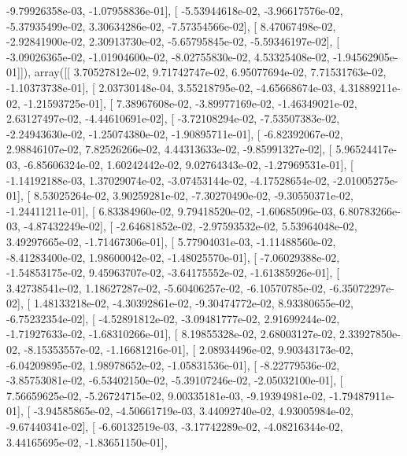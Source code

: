 \documentclass{article}
\begin{document}
         -9.79926358e-03,  -1.07958836e-01],
       [ -5.53944618e-02,  -3.96617576e-02,  -5.37935499e-02,
          3.30634286e-02,  -7.57354566e-02],
       [  8.47067498e-02,  -2.92841900e-02,   2.30913730e-02,
         -5.65795845e-02,  -5.59346197e-02],
       [ -3.09026365e-02,  -1.01904600e-02,  -8.02755830e-02,
          4.53325408e-02,  -1.94562905e-01]]), array([[  3.70527812e-02,   9.71742747e-02,   6.95077694e-02,
          7.71531763e-02,  -1.10373738e-01],
       [  2.03730148e-04,   3.55218795e-02,  -4.65668674e-03,
          4.31889211e-02,  -1.21593725e-01],
       [  7.38967608e-02,  -3.89977169e-02,  -1.46349021e-02,
          2.63127497e-02,  -4.44610691e-02],
       [ -3.72108294e-02,  -7.53507383e-02,  -2.24943630e-02,
         -1.25074380e-02,  -1.90895711e-01],
       [ -6.82392067e-02,   2.98846107e-02,   7.82526266e-02,
          4.44313633e-02,  -9.85991327e-02],
       [  5.96524417e-03,  -6.85606324e-02,   1.60242442e-02,
          9.02764343e-02,  -1.27969531e-01],
       [ -1.14192188e-03,   1.37029074e-02,  -3.07453144e-02,
         -4.17528654e-02,  -2.01005275e-01],
       [  8.53025264e-02,   3.90259281e-02,  -7.30270490e-02,
         -9.30550371e-02,  -1.24411211e-01],
       [  6.83384960e-02,   9.79418520e-02,  -1.60685096e-03,
          6.80783266e-03,  -4.87432249e-02],
       [ -2.64681852e-02,  -2.97593532e-02,   5.53964048e-02,
          3.49297665e-02,  -1.71467306e-01],
       [  5.77904031e-03,  -1.11488560e-02,  -8.41283400e-02,
          1.98600042e-02,  -1.48025570e-01],
       [ -7.06029388e-02,  -1.54853175e-02,   9.45963707e-02,
         -3.64175552e-02,  -1.61385926e-01],
       [  3.42738541e-02,   1.18627287e-02,  -5.60406257e-02,
         -6.10570785e-02,  -6.35072297e-02],
       [  1.48133218e-02,  -4.30392861e-02,  -9.30474772e-02,
          8.93380655e-02,  -6.75232354e-02],
       [ -4.52891812e-02,  -3.09481777e-02,   2.91699244e-02,
         -1.71927633e-02,  -1.68310266e-01],
       [  8.19855328e-02,   2.68003127e-02,   2.33927850e-02,
         -8.15353557e-02,  -1.16681216e-01],
       [  2.08934496e-02,   9.90343173e-02,  -6.04209895e-02,
          1.98978652e-02,  -1.05831536e-01],
       [ -8.22779536e-02,  -3.85753081e-02,  -6.53402150e-02,
         -5.39107246e-02,  -2.05032100e-01],
       [  7.56659625e-02,  -5.26724715e-02,   9.00335181e-03,
         -9.19394981e-02,  -1.79487911e-01],
       [ -3.94585865e-02,  -4.50661719e-03,   3.44092740e-02,
          4.93005984e-02,  -9.67440341e-02],
       [ -6.60132519e-03,  -3.17742289e-02,  -4.08216344e-02,
          3.44165695e-02,  -1.83651150e-01],
\end{document}
